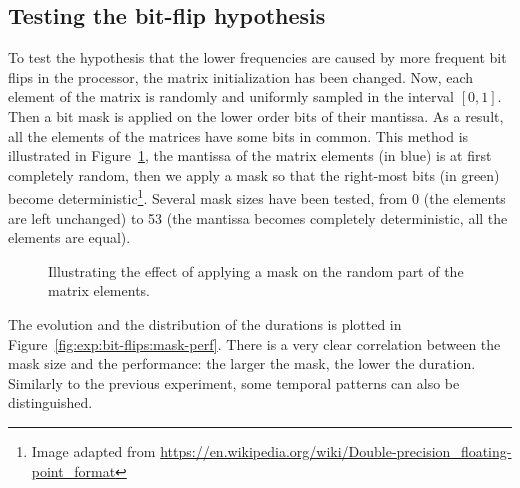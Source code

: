         \subsection{Testing the bit-flip hypothesis}
            To test the hypothesis that the lower frequencies are caused by more frequent bit flips in the processor,
            the matrix initialization has been changed. Now, each element of the matrix is randomly and uniformly
            sampled in the interval \([0,1]\). Then a bit mask is applied on the lower order bits of their mantissa. As
            a result, all the elements of the matrices have some bits in common. This method is illustrated in
            Figure~\ref{fig:exp:bit-flips:mask_illustration}, the mantissa of the matrix elements (in blue) is at first
            completely random, then we apply a mask so that the right-most bits (in green) become
            deterministic\footnote{Image adapted from
            \url{https://en.wikipedia.org/wiki/Double-precision_floating-point_format}}.  Several mask sizes have been
            tested, from 0 (the elements are left unchanged) to 53 (the mantissa becomes completely deterministic, all
            the elements are equal).
            \begin{figure}[htpb]
                \begin{center}
                    
                    \vspace{-0.2cm}


                    \vspace{-0.2cm}
                    
                \end{center}
                \caption{Illustrating the effect of applying a mask on the random part of the matrix
                elements.\label{fig:exp:bit-flips:mask_illustration}}
            \end{figure}

            The evolution and the distribution of the \dgemm durations is plotted in
            Figure~\ref{fig:exp:bit-flips:mask-perf}. There is a very clear correlation between the mask size and the
            performance: the larger the mask, the lower the duration. Similarly to the previous experiment, some
            temporal patterns can also be distinguished.

